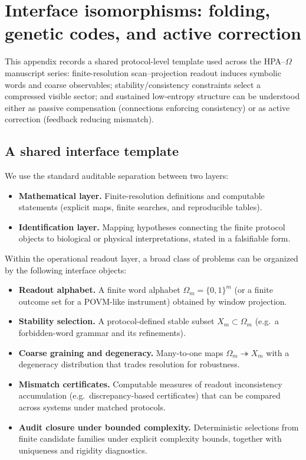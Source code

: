 \section{Interface isomorphisms: folding, genetic codes, and active correction}
\label{app:isomorphism_dictionary}

This appendix records a shared protocol-level template used across the HPA--$\Omega$ manuscript series: finite-resolution scan--projection readout induces symbolic words and coarse observables; stability/consistency constraints select a compressed visible sector; and sustained low-entropy structure can be understood either as passive compensation (connections enforcing consistency) or as active correction (feedback reducing mismatch).

\subsection{A shared interface template}
We use the standard auditable separation between two layers:
\begin{itemize}
  \item \textbf{Mathematical layer.} Finite-resolution definitions and computable statements (explicit maps, finite searches, and reproducible tables).
  \item \textbf{Identification layer.} Mapping hypotheses connecting the finite protocol objects to biological or physical interpretations, stated in a falsifiable form.
\end{itemize}
Within the operational readout layer, a broad class of problems can be organized by the following interface objects:
\begin{itemize}
  \item \textbf{Readout alphabet.} A finite word alphabet $\Omega_m=\{0,1\}^m$ (or a finite outcome set for a POVM-like instrument) obtained by window projection.
  \item \textbf{Stability selection.} A protocol-defined stable subset $X_m\subset\Omega_m$ (e.g.\ a forbidden-word grammar and its refinements).
  \item \textbf{Coarse graining and degeneracy.} Many-to-one maps $\Omega_m\twoheadrightarrow X_m$ with a degeneracy distribution that trades resolution for robustness.
  \item \textbf{Mismatch certificates.} Computable measures of readout inconsistency accumulation (e.g.\ discrepancy-based certificates) that can be compared across systems under matched protocols.
  \item \textbf{Audit closure under bounded complexity.} Deterministic selections from finite candidate families under explicit complexity bounds, together with uniqueness and rigidity diagnostics.
\end{itemize}

